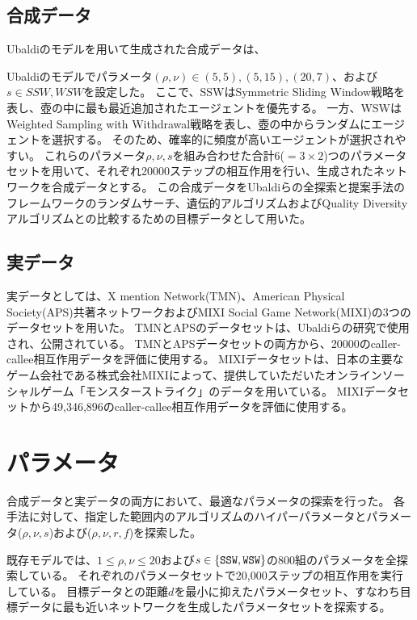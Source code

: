 \documentclass[uplatex,11pt,openany]{ujreport}
\begin{document}
        \subsection{合成データ}
            Ubaldiのモデルを用いて生成された合成データは、

            Ubaldiのモデルでパラメータ$(\rho,\nu)\in {(5,5),(5,15),(20,7)}$、および$s\in{SSW,WSW}$を設定した。
            ここで、SSWはSymmetric Sliding Window戦略を表し、壺の中に最も最近追加されたエージェントを優先する。
            一方、WSWはWeighted Sampling with Withdrawal戦略を表し、壺の中からランダムにエージェントを選択する。
            そのため、確率的に頻度が高いエージェントが選択されやすい。
            これらのパラメータ$\rho,\nu,s$を組み合わせた合計6($=3\times2$)つのパラメータセットを用いて、それぞれ20000ステップの相互作用を行い、生成されたネットワークを合成データとする。
            この合成データをUbaldiらの全探索と提案手法のフレームワークのランダムサーチ、遺伝的アルゴリズムおよびQuality Diversityアルゴリズムとの比較するための目標データとして用いた。

        \subsection{実データ}
            実データとしては、X mention Network(TMN)、American Physical Society(APS)共著ネットワークおよびMIXI Social Game Network(MIXI)の3つのデータセットを用いた。
            TMNとAPSのデータセットは、Ubaldiらの研究\cite{ubaldiEmergenceEvolutionSocial2021}で使用され、公開されている。
            TMNとAPSデータセットの両方から、20000のcaller-callee相互作用データを評価に使用する。
            MIXIデータセットは、日本の主要なゲーム会社である株式会社MIXIによって、提供していただいたオンラインソーシャルゲーム「モンスターストライク」のデータを用いている。
            MIXIデータセットから49,346,896のcaller-callee相互作用データを評価に使用する。

    \section{パラメータ}
        合成データと実データの両方において、最適なパラメータの探索を行った。
        各手法に対して、指定した範囲内のアルゴリズムのハイパーパラメータとパラメータ($\rho,\nu,s$)および($\rho,\nu,r,f$)を探索した。

        既存モデルでは、$1\leq \rho,\nu\leq20$および$s\in\{\verb|SSW|,\verb|WSW|\}$の800組のパラメータを全探索している。
        それぞれのパラメータセットで20,000ステップの相互作用を実行している。
        目標データとの距離$d$を最小に抑えたパラメータセット、すなわち目標データに最も近いネットワークを生成したパラメータセットを探索する。
\end{document}
